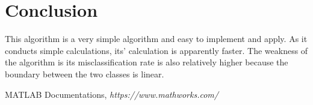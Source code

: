 \section{Conclusion}
This algorithm is a very simple algorithm and easy to implement and apply. As it conducts simple calculations, its’ calculation is apparently faster. The weakness of the algorithm is its misclassification rate is also relatively higher because the boundary between the two classes is linear.

\begin{thebibliography}{00}
MATLAB Documentations,
\textit{https://www.mathworks.com/}
\end{thebibliography}
